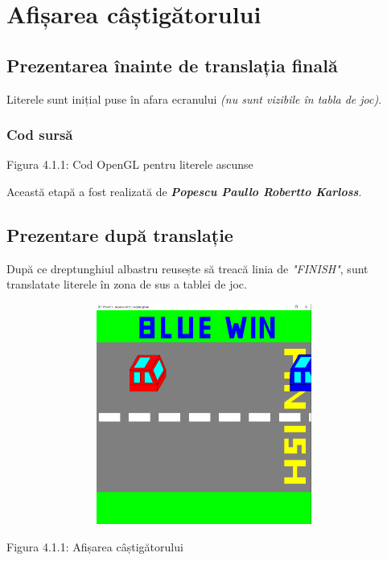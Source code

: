 \documentclass[12pt]{report}
\begin{document}
    \chapter{Afișarea câștigătorului}
    \section{Prezentarea înainte de translația finală}
    Literele sunt inițial puse în afara ecranului \emph{(nu sunt vizibile în tabla de joc)}.
    \subsection{Cod sursă}
    
    \begin{center}
        Figura 4.1.1: Cod OpenGL pentru literele ascunse
    \end{center}

    Această etapă a fost realizată de \emph{\textbf{Popescu Paullo Robertto Karloss}}.

    \section{Prezentare după translație}
    După ce dreptunghiul albastru reusește să treacă linia de \emph{"FINISH"}, sunt translatate literele în zona de sus a tablei de joc.
    \begin{center}
        \includegraphics[width=13cm, height=7.25cm]{Poza12.png}
    \end{center}
    \begin{center}
        Figura 4.1.1: Afișarea câștigătorului
    \end{center}
\end{document}
